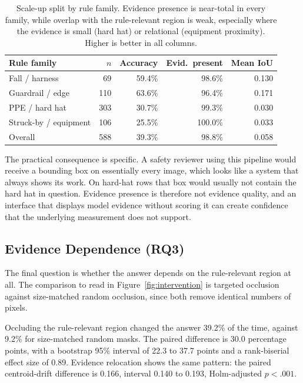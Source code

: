 \documentclass[conference]{IEEEtran}
\begin{document}
\begin{table}[tb]
\centering
\caption{Scale-up split by rule family. Evidence presence is near-total in every family, while overlap with the rule-relevant region is weak, especially where the evidence is small (hard hat) or relational (equipment proximity). Higher is better in all columns.}
\label{tab:rulelevel}
{\footnotesize
\begin{tabular}{L{0.95in}rrrr}
\toprule
Rule family & $n$ & Accuracy & Evid.\ present & Mean IoU \\
\midrule
Fall / harness & 69 & 59.4\% & 98.6\% & 0.130 \\
Guardrail / edge & 110 & 63.6\% & 96.4\% & 0.171 \\
PPE / hard hat & 303 & 30.7\% & 99.3\% & 0.030 \\
Struck-by / equipment & 106 & 25.5\% & 100.0\% & 0.033 \\
\midrule
Overall & 588 & 39.3\% & 98.8\% & 0.058 \\
\bottomrule
\end{tabular}
\par}
\end{table}

The practical consequence is specific. A safety reviewer using this pipeline would receive a bounding box on essentially every image, which looks like a system that always shows its work. On hard-hat rows that box would usually not contain the hard hat in question. Evidence presence is therefore not evidence quality, and an interface that displays model evidence without scoring it can create confidence that the underlying measurement does not support.

\subsection{Evidence Dependence (RQ3)}

The final question is whether the answer depends on the rule-relevant region at all. The comparison to read in Figure~\ref{fig:intervention} is targeted occlusion against size-matched random occlusion, since both remove identical numbers of pixels.

Occluding the rule-relevant region changed the answer 39.2\% of the time, against 9.2\% for size-matched random masks. The paired difference is 30.0 percentage points, with a bootstrap 95\% interval of 22.3 to 37.7 points and a rank-biserial effect size of 0.89. Evidence relocation shows the same pattern: the paired centroid-drift difference is 0.166, interval 0.140 to 0.193, Holm-adjusted $p < .001$.
\end{document}
